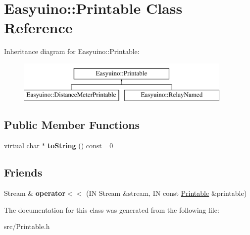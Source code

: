 \hypertarget{class_easyuino_1_1_printable}{}\section{Easyuino\+:\+:Printable Class Reference}
\label{class_easyuino_1_1_printable}
Inheritance diagram for Easyuino\+:\+:Printable\+:\begin{figure}[H]
\begin{center}
\leavevmode
\includegraphics[height=2.000000cm]{class_easyuino_1_1_printable}
\end{center}
\end{figure}
\subsection*{Public Member Functions}
\begin{DoxyCompactItemize}
\item 
\mbox{\label{class_easyuino_1_1_printable_a49ae1c60dc0404600ee122c6c2684155}} 
virtual char $\ast$ {\bfseries to\+String} () const =0
\end{DoxyCompactItemize}
\subsection*{Friends}
\begin{DoxyCompactItemize}
\item 
\mbox{\label{class_easyuino_1_1_printable_a50c7f93c6a84fde9f1f97f1185d853d9}} 
Stream \& {\bfseries operator$<$$<$} (IN Stream \&stream, IN const \hyperlink{class_easyuino_1_1_printable}{Printable} \&printable)
\end{DoxyCompactItemize}


The documentation for this class was generated from the following file\+:\begin{DoxyCompactItemize}
\item 
src/Printable.\+h\end{DoxyCompactItemize}
